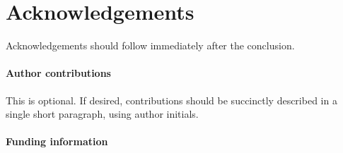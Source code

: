 \documentclass[edipack_sp.tex]{subfiles}
\begin{document}

\section*{Acknowledgements}
Acknowledgements should follow immediately after the conclusion.


\paragraph{Author contributions}
This is optional. If desired, contributions should be succinctly described in a single short paragraph, using author initials.



\paragraph{Funding information}




\end{document}
